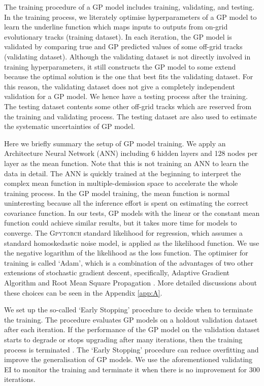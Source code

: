 The training procedure of a GP model includes training, validating, and testing. 
In the training process, we literately optimise hyperparameters of a GP model to learn the underline function which maps inputs to outputs from on-grid evolutionary tracks (training dataset). In each iteration, the GP model is validated by comparing true and GP predicted values of some off-grid tracks (validating dataset). Although the validating dataset is not directly involved in training hyperparameters, it still constructs the GP model to some extend because the optimal solution is the one that best fits the validating dataset. For this reason, the validating dataset does not give a completely independent validation for a GP model. We hence have a testing process after the training. The testing dataset contents some other off-grid tracks which are reserved  from the training and validating process. The testing dataset are also used to estimate the systematic uncertainties of GP model. 

Here we briefly summary the setup of GP model training. 
%
We apply an Architecture Neural Network (ANN) including 6 hidden layers and 128 nodes per layer as the mean function. Note that this is not training an ANN to learn the data in detail. The ANN is quickly trained at the beginning to interpret the complex mean function in multiple-demission space to accelerate the whole training process. In the GP model training, the mean function is normal uninteresting because all the inference effort is spent on estimating the correct covariance function. In our tests, GP models with the linear or the constant mean function could achieve similar results, but it takes more time for models to converge.
%
The \textsc{Gpytorch} standard likelihood for regression, which assumes a standard homoskedastic noise model, is applied as the likelihood function. We use the negative logarithm of the likelihood as the loss function. The optimiser for training is called `Adam', which is a combination of the advantages of two other extensions of stochastic gradient descent, specifically, Adaptive Gradient Algorithm and Root Mean Square Propagation \citep{kingma2017adam}. More detailed discussions about these choices can be seen in the Appendix \ref{app:A}. 

%
We set up the so-called `Early Stopping' procedure to decide when to terminate the training. The procedure evaluates GP models on a holdout validation dataset after each iteration. If the performance of the GP model on the validation dataset starts to degrade or stops upgrading after many iterations, then the training process is terminated \citep[see discussions in][]{anzai2012pattern,goodfellow2016deep}. The `Early Stopping' procedure can reduce overfitting and improve the generalisation of GP models. We use the aforementioned validating EI to monitor the training and terminate it when there is no improvement for 300 iterations.


